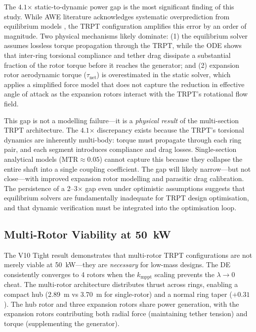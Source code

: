 \documentclass[11pt,a4paper]{article}
\begin{document}
The $4.1$$\times$ static-to-dynamic power gap is the most significant finding of this study. While AWE literature acknowledges systematic overprediction from equilibrium models \cite[18--21\%]{kheiri2018,leuthold2019,carceller2022,pfister2020}, the TRPT configuration amplifies this error by an order of magnitude. Two physical mechanisms likely dominate: (1) the equilibrium solver assumes lossless torque propagation through the TRPT, while the ODE shows that inter-ring torsional compliance and tether drag dissipate a substantial fraction of the rotor torque before it reaches the generator; and (2) expansion rotor aerodynamic torque ($\tau_{\mathrm{net}}$) is overestimated in the static solver, which applies a simplified force model that does not capture the reduction in effective angle of attack as the expansion rotors interact with the TRPT's rotational flow field.

This gap is not a modelling failure—it is a \emph{physical result} of the multi-section TRPT architecture. The $4.1$$\times$ discrepancy exists because the TRPT's torsional dynamics are inherently multi-body: torque must propagate through each ring pair, and each segment introduces compliance and drag losses. Single-section analytical models ($\mathrm{MTR} \approx 0.05$) cannot capture this because they collapse the entire shaft into a single coupling coefficient. The gap will likely narrow—but not close—with improved expansion rotor modelling and parasitic drag calibration. The persistence of a 2--3$\times$ gap even under optimistic assumptions suggests that equilibrium solvers are fundamentally inadequate for TRPT design optimisation, and that dynamic verification must be integrated into the optimisation loop.

\subsection{Multi-Rotor Viability at 50~kW}

The V10 Tight result demonstrates that multi-rotor TRPT configurations are not merely viable at 50~kW—they are \emph{necessary} for low-mass designs. The DE consistently converges to 4 rotors when the $k_{\mathrm{mppt}}$ scaling prevents the $\lambda \to 0$ cheat. The multi-rotor architecture distributes thrust across rings, enabling a compact hub (2.89~m vs 3.70~m for single-rotor) and a normal ring taper ($+0.31$). The hub rotor and three expansion rotors share power generation, with the expansion rotors contributing both radial force (maintaining tether tension) and torque (supplementing the generator).
\end{document}
